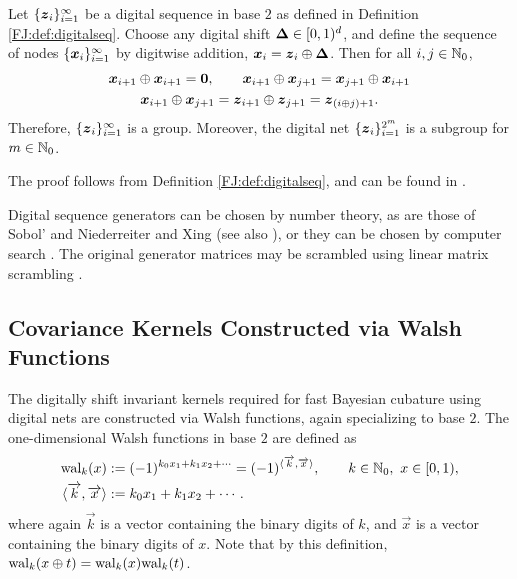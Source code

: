 \documentclass[graybox,footinfo]{svmult}
\begin{document}
\begin{lemma}
	\label{FJ:lemma:digital_net_prop}
	Let $\{{\boldsymbol{z}}_i\}_{i=1}^{\infty}$ be a digital sequence in base $2$ as defined in Definition \ref{FJ:def:digitalseq}.  Choose any digital shift ${\boldsymbol{\Delta}} \in [0,1)^d$, and define the sequence of nodes $\{{\boldsymbol{x}}_i\}_{i=1}^{\infty}$ by digitwise addition, ${\boldsymbol{x}}_{i} = {\boldsymbol{z}}_{i} \oplus {\boldsymbol{\Delta}}$.
	Then for all $i,j \in {\mathbb{N}}_0$,
	\begin{gather}
		\label{FJ:eqn:digital_net_symmetric_prop}
	\bsx_{i+1} \oplus \bsx_{i+1} = \boldsymbol{0}, \qquad 
	\bsx_{i+1} \oplus \bsx_{j+1} = \bsx_{j+1} \oplus \bsx_{i+1} \\
	\label{FJ:eqn:digital_shift_prop}
	\bsx_{i+1} \oplus \bsx_{j+1} = \bsz_{i+1} \oplus \bsz_{j+1} = \bsz_{(i \oplus j) + 1 }.
	\end{gather}
	Therefore, $\{{\boldsymbol{z}}_i\}_{i=1}^{\infty}$ is a group.  Moreover, the digital net $\{{\boldsymbol{z}}_i\}_{i=1}^{2^m}$ is a subgroup for $m \in {{\mathbb{N}}}_0$.
\end{lemma}
The proof follows from Definition \ref{FJ:def:digitalseq}, and can be found in \cite{JagThesis19a}.

Digital sequence generators can be chosen by number theory, as are those of Sobol' \cite{Sob67} and Niederreiter and Xing  \cite{NieXin01a} (see also \cite[Chapter 8]{DicPil10a}), or they can be chosen by computer search \cite[Chapter 10]{DicPil10a}.  The original generator matrices may be scrambled using linear matrix scrambling \cite{Mat98}.


\subsection{Covariance Kernels Constructed via Walsh Functions} \label{FJ:sec:Walsh_kernels}

The digitally shift invariant kernels required for fast Bayesian cubature using digital nets are constructed via Walsh functions, again specializing to base $2$. 
The one-dimensional Walsh functions in base $2$ are defined as
\begin{align}
    \label{FJ:eqn:walsh_func}
\textup{wal}_{k}(x) & := (-1)^{k_0 x_1 + k_1 x_2 + \cdots} = (-1)^{\langle \overrightarrow{k}, \overrightarrow{x} \rangle},  \qquad k \in {\N}_0, \ x \in [0,1), \\
\nonumber
\langle \overrightarrow{k}, \overrightarrow{x} \rangle & : = k_{0} x_{1} + k_{1} x_{2} + \cdots .
\end{align}
where again $\overrightarrow{k}$ is a vector containing the binary digits of $k$, and $\overrightarrow{x}$ is a vector containing the binary digits of $x$.  Note that by this definition, $\textup{wal}_{k}(x \oplus t) =  \textup{wal}_{k}(x) \textup{wal}_{k}(t)$.  
\end{document}
